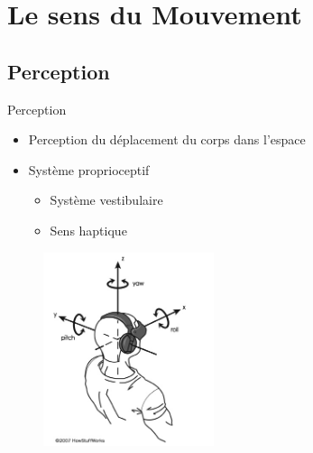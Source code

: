 \documentclass[compress, noflama]{beamer}
\begin{document}
\section{Le sens du Mouvement}
\subsection{Perception}
\begin{frame}{Perception}
\begin{multicols}{2}
\begin{itemize}
\item Perception du déplacement du corps dans l'espace
\item Système proprioceptif
\begin{itemize}
\item Système vestibulaire
\item Sens haptique
\end{itemize}
\end{itemize}
\begin{figure}
\centering
\includegraphics[width=5cm]{images/dof}
\end{figure}
\end{multicols}
\end{frame}
\end{document}
